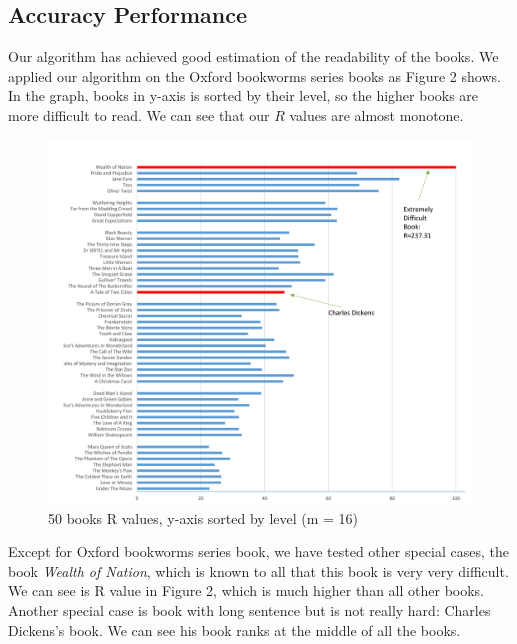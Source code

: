 \documentclass{article}
\begin{document}
\subsection{Accuracy Performance}
Our algorithm has achieved good estimation of the readability of the books. We applied our algorithm on the Oxford bookworms series books as Figure 2 shows. In the graph, books in y-axis is sorted by their level, so the higher books are more difficult to read. We can see that our $R$ values are almost monotone.
\begin{figure}[H]
\begin{center}
\includegraphics[width=1\textwidth]{50books} 
\caption{50 books R values, y-axis sorted by level (m = 16)}
\end{center}
\end{figure}

Except for Oxford bookworms series book, we have tested other special cases, the book \textit{Wealth of Nation}, which is known to all that this book is very very difficult. We can see is R value in Figure 2, which is much higher than all other books. Another special case is book with long sentence but is not really hard: Charles Dickens's book. We can see his book ranks at the middle of all the books.
\end{document}
